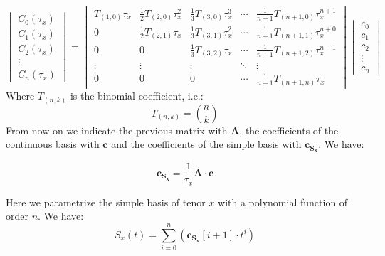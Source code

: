 \documentclass{article}
\begin{document}
\begin{appendices}
\begin{equation}
\begin{vmatrix} C_0(\tau_x) \\ C_1(\tau_x) \\ C_2(\tau_x) \\ \vdots \\ C_n(\tau_x) \end{vmatrix} = 
\begin{vmatrix}  
T_{(1,0)} \tau_x & \frac{1}{2}T_{(2,0)}\tau_x^2  & \frac{1}{3}T_{(3,0)}\tau_x^3  & \cdots & \frac{1}{n+1}T_{(n+1,0)}\tau_x^{n+1}  \\ 
0                & \frac{1}{2}T_{(2,1)}\tau_x    & \frac{1}{3}T_{(3,1)}\tau_x^2  & \cdots & \frac{1}{n+1}T_{(n+1,1)}\tau_x^{n+0}  \\
0                & 0                             & \frac{1}{3}T_{(3,2)}\tau_x    & \cdots & \frac{1}{n+1}T_{(n+1,2)}\tau_x^{n-1}  \\
\vdots           & \vdots                        & \vdots                        & \ddots & \vdots                                \\
0                & 0                             & 0                             & \cdots & \frac{1}{n+1}T_{(n+1,n)}\tau_x       
\end{vmatrix} 
\begin{vmatrix} c_0 \\ c_1 \\ c_2 \\ \vdots \\ c_n \end{vmatrix}
\end{equation}
Where $T_{(n,k)}$ is the binomial coefficient, i.e.:
\begin{equation}
T_{(n,k)} = \binom{n}{k}
\end{equation}
From now on we indicate the previous matrix with $\mathbf{A}$, the coefficients of the continuous basis with $\mathbf{c}$ and the coefficients of the simple basis with $\mathbf{c_{S_x}}$. We have:

\begin{equation} \label{eq:simplefromcontinuouspolynomial}
\mathbf{c_{S_x}} = \frac{1}{\tau_x} \mathbf{A} \cdot \mathbf{c}
\end{equation}

Here we parametrize the simple basis of tenor $x$ with a polynomial function of order $n$. We have:
\begin{equation}
S_x(t) = \sum_{i=0}^{n}(\mathbf{c_{S_x}}[i+1] \cdot t^i)
\end{equation}


\end{appendices}
\end{document}
